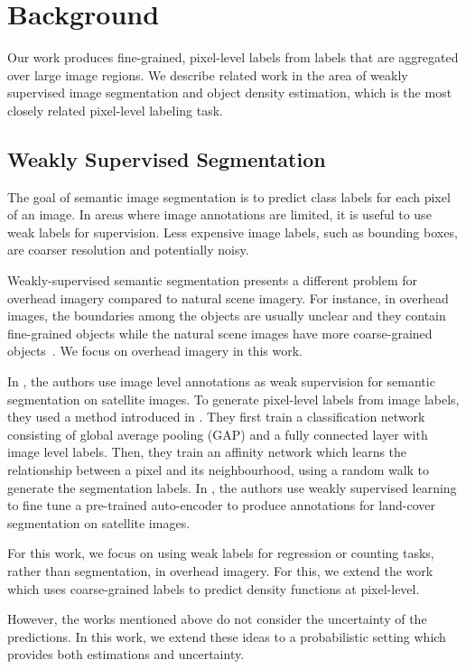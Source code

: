 \documentclass[10pt,twocolumn,letterpaper]{article}
\begin{document}
\section{Background}

Our work produces fine-grained, pixel-level labels from labels that are aggregated over large image regions. We describe related work in the area of weakly supervised image segmentation and object density estimation, which is the most closely related pixel-level labeling task.

\subsection{Weakly Supervised Segmentation}

The goal of semantic image segmentation is to predict class labels for each pixel of an image. In areas where image annotations are limited, it is useful to use weak labels for supervision. Less expensive image labels, such as bounding boxes, are coarser resolution and potentially noisy.

Weakly-supervised semantic segmentation presents a different problem for overhead imagery compared to natural scene imagery. For instance, in overhead images, the boundaries among the objects are usually unclear and they contain fine-grained objects while the natural scene images have more coarse-grained objects~\cite{Chan_2020}. We focus on overhead imagery in this work.

In \cite{Nivaggioli2019WeaklySS}, the authors use image level annotations as weak supervision for semantic segmentation on satellite images. To generate pixel-level labels from image labels, they used a method introduced in \cite{Ahn_2018_CVPR}. They first train a classification network consisting of global average pooling (GAP) and a fully connected layer with image level labels. Then, they train an affinity network which learns the relationship between a pixel and its neighbourhood, using a random walk to generate the segmentation labels.
In \cite{7414501}, the authors use weakly supervised learning to fine tune a pre-trained auto-encoder to produce annotations for land-cover segmentation on satellite images.

For this work, we focus on using weak labels for regression or counting tasks, rather than segmentation, in overhead imagery. For this, we extend the work \cite{jacobs2018weakly} which uses coarse-grained labels to predict density functions at pixel-level. 

However, the works mentioned above do not consider the uncertainty of the predictions. In this work, we extend these ideas to a probabilistic setting which provides both estimations and uncertainty.
\end{document}
